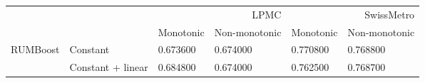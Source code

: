 \begin{tabular}{llllll}
\toprule
 &  & \multicolumn{2}{r}{LPMC} & \multicolumn{2}{r}{SwissMetro} \\
 &  & Monotonic & Non-monotonic & Monotonic & Non-monotonic \\
\midrule
\multirow[t]{2}{*}{RUMBoost} & Constant & 0.673600 & 0.674000 & 0.770800 & 0.768800 \\
 & Constant + linear & 0.684800 & 0.674000 & 0.762500 & 0.768700 \\
\cline{1-6}
\bottomrule
\end{tabular}
